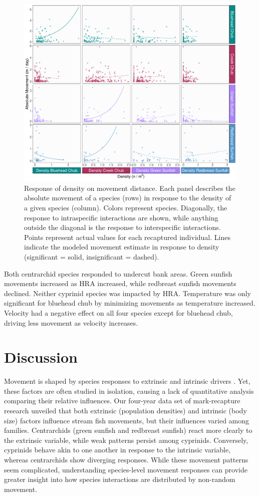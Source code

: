 \documentclass[11pt, class=article, crop=false]{standalone}
\begin{document}
\begin{figure}
    \centering
    \includegraphics[width=0.8\linewidth]{output/fig_density.pdf}
    \caption{Response of density on movement distance. Each panel describes the absolute movement of a species (rows) in response to the density of a given species (column). Colors represent species. Diagonally, the response to intraspecific interactions are shown, while anything outside the diagonal is the response to interspecific interactions. Points represent actual values for each recaptured individual. Lines indicate the modeled movement estimate in response to density (significant = solid, insignificant = dashed).}
    \label{fig:fig_density}
\end{figure}

Both centrarchid species responded to undercut bank areas. Green sunfish movements increased as HRA increased, while redbreast sunfish movements declined. Neither cyprinid species was impacted by HRA. Temperature was only significant for bluehead chub by minimizing movements as temperature increased. Velocity had a negative effect on all four species except for bluehead chub, driving less movement as velocity increases. 

\section{Discussion}

Movement is shaped by species responses to extrinsic and intrinsic drivers \citep{clobertDispersalEcologyEvolution2012}. Yet, these factors are often studied in isolation, causing a lack of quantitative analysis comparing their relative influences. Our four-year data set of mark-recapture research unveiled that both extrinsic (population densities) and intrinsic (body size) factors influence stream fish movements, but their influences varied among families. Centrarchids (green sunfish and redbreast sunfish) react more clearly to the extrinsic variable, while weak patterns persist among cyprinids. Conversely, cyprinids behave akin to one another in response to the intrinsic variable, whereas centrarchids show diverging responses. While these movement patterns seem complicated, understanding species-level movement responses can provide greater insight into how species interactions are distributed by non-random movement. 
\end{document}
